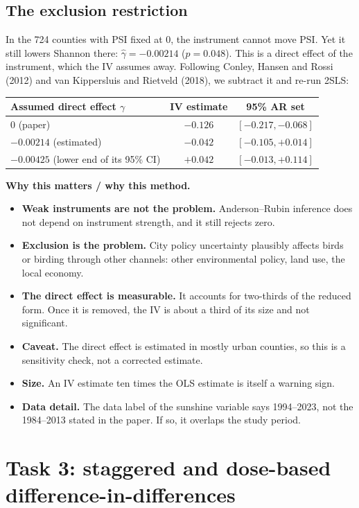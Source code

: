 \documentclass[11pt]{article}
\newcommand{\why}[1]{\begin{whybox}\small\textbf{Why this matters / why this method.} #1\end{whybox}}
\begin{document}
\subsection{The exclusion restriction}
In the 724 counties with PSI fixed at 0, the instrument cannot move PSI. Yet it still lowers Shannon there: $\hat\gamma=-0.00214$ ($p=0.048$). This is a direct effect of the instrument, which the IV assumes away. Following Conley, Hansen and Rossi (2012) and van Kippersluis and Rietveld (2018), we subtract it and re-run 2SLS:
\begin{center}\small
\begin{tabular}{lcc}
\toprule
Assumed direct effect $\gamma$ & IV estimate & 95\% AR set \\
\midrule
0 (paper) & $-0.126$ & $[-0.217,-0.068]$ \\
$-0.00214$ (estimated) & $-0.042$ & $[-0.105,+0.014]$ \\
$-0.00425$ (lower end of its 95\% CI) & $+0.042$ & $[-0.013,+0.114]$ \\
\bottomrule
\end{tabular}
\end{center}
\why{\begin{itemize}[leftmargin=12pt,itemsep=1pt,topsep=1pt]
\item \textbf{Weak instruments are not the problem.} Anderson--Rubin inference does not depend on instrument strength, and it still rejects zero.
\item \textbf{Exclusion is the problem.} City policy uncertainty plausibly affects birds or birding through other channels: other environmental policy, land use, the local economy.
\item \textbf{The direct effect is measurable.} It accounts for two-thirds of the reduced form. Once it is removed, the IV is about a third of its size and not significant.
\item \textbf{Caveat.} The direct effect is estimated in mostly urban counties, so this is a sensitivity check, not a corrected estimate.
\item \textbf{Size.} An IV estimate ten times the OLS estimate is itself a warning sign.
\item \textbf{Data detail.} The data label of the sunshine variable says 1994--2023, not the 1984--2013 stated in the paper. If so, it overlaps the study period.
\end{itemize}}

\section{Task 3: staggered and dose-based difference-in-differences}
\end{document}
